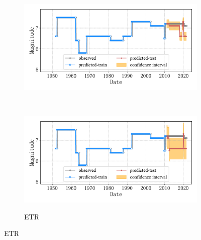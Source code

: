 \begin{figure}[!htbp]
\begin{subfigure}[b]{0.45\textwidth}
    \includegraphics[width=\textwidth]{Img/chap5_seism/split85/seism_kn_minyear_1932_maxyear_2021_spanlat_2_spanlon_4_timewindow_120_nextmonth_120_minmag_3.0_split_ratio_0.85_blocks1.pdf}
    \vspace{-1cm}
    \label{fig:seism_knn_minyear_1932_maxyear_2021_spanlat_2_spanlon_4_timewindow_120_nextmonth_120_minmag_3.0_split_ratio_0.85_blocks1}
  \end{subfigure}
  ~
  \begin{subfigure}[b]{0.45\textwidth}
    \caption{ETR}
    \vspace{-0.2cm}
    \includegraphics[width=\textwidth]{Img/chap5_seism/split85/seism_etr_minyear_1932_maxyear_2021_spanlat_2_spanlon_4_timewindow_120_nextmonth_120_minmag_3.0_split_ratio_0.85_blocks1.pdf}
    \vspace{-1cm}
    \label{fig:seism_etr_minyear_1932_maxyear_2021_spanlat_2_spanlon_4_timewindow_120_nextmonth_120_minmag_3.0_split_ratio_0.85_blocks1}
  \end{subfigure}
  \label{fig:seism_minyear_1932_maxyear_2021_spanlat_2_spanlon_4_timewindow_120_nextmonth_120_minmag_3.0_split_ratio_0.85_blocks1}
\end{figure}

